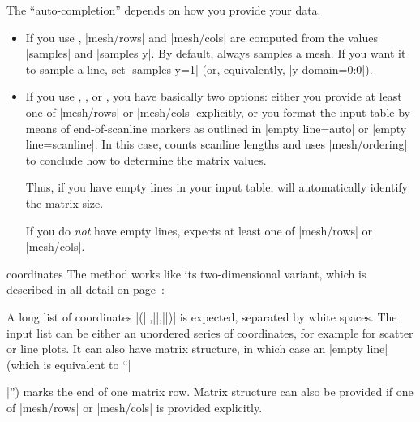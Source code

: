 {\begin{addplot3generic}
\begin{enumerate}
            The ``auto-completion'' depends on how you provide your data.
            \begin{itemize}
                \item If you use ,
                    |mesh/rows| and |mesh/cols| are computed from the
                    values |samples| and |samples y|. By default,
                     always samples a
                    mesh. If you want it to sample a line, set
                    |samples y=1| (or, equivalently, |y domain=0:0|).
                \item If you use ,
                    , or
                    , you have basically two
                    options: either you provide at least one of |mesh/rows|
                    or |mesh/cols| explicitly, or you format the input
                    table by means of end-of-scanline markers as outlined
                    in |empty line=auto| or |empty line=scanline|. In this
                    case, \PGFPlots{} counts scanline lengths and uses
                    |mesh/ordering| to conclude how to determine the matrix
                    values.

                    Thus, if you have empty lines in your input table,
                    \PGFPlots{} will automatically identify the matrix size.

                    If you do \emph{not} have empty lines, \PGFPlots{} expects
                    at least one of |mesh/rows| or |mesh/cols|.
            \end{itemize}
    \end{enumerate}
\end{addplot3generic}

\begin{addplot3operation}[]{coordinates}{}
    The  method works like its
    two-dimensional variant,  which is
    described in all detail on page~\pageref{pgfplots:addplot:coordinates}:

    A long list of coordinates |(||,||,||)| is
    expected, separated by white spaces. The input list can be either an
    unordered series of coordinates, for example for scatter or line plots. It
    can also have matrix structure, in which case an |empty line| (which is
    equivalent to ``|\par|'') marks the end of one matrix row. Matrix structure
    can also be provided if one of |mesh/rows| or |mesh/cols| is provided
    explicitly.


\end{addplot3operation}}
